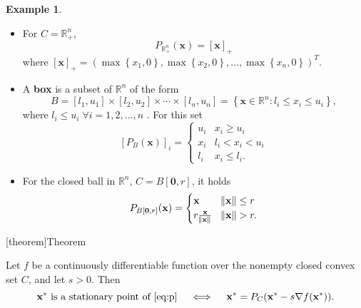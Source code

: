 \documentclass[12pt]{report}
\theoremstyle{definition}
\begin{document}
\newtheorem{examples of orthogonal projections}[theorem]{Example}
\begin{examples of orthogonal projections}
    \;

    \begin{itemize}
        \item For $C=\mathbb{R}_+^n$,
            \[
                P_{\mathbb{R}_+^n}(\mathbf{x})={[\mathbf{x}]}_{+}
            \]
            where
            ${[\mathbf{x}]}_{+}={(\max{\left\{x_1,0\right\}},\max{\left\{x_2,0\right\}},\ldots,\max{\left\{x_n,0\right\}})}^{T}$.
            
        \item A \textbf{box} is a subset of $\mathbb{R}^{n}$ of the form
            \[
                B=[l_1,u_1]\times[l_2,u_2]\times\cdots\times[l_n,u_n]
                =\left\{\mathbf{x}\in\mathbb{R}^{n}:l_i\le x_i\le u_i\right\},
            \]
            where $l_i\le u_i\;\forall i=1,2,\ldots,n$ . For this set
            \[
                {[P_B(\mathbf{x})]}_{i}=
                \begin{cases}
                    u_i & x_i\ge u_i \\
                    x_i & l_i<x_i<u_i \\
                    l_i & x_i\le l_i.
                \end{cases}
            \]
        \item For the closed ball in $\mathbb{R}^{n}$, $C=B[\mathbf{0},r]$, it
            holds
            \[
                P_{B[\mathbf{0},r]}(\mathbf{x})=
                \begin{cases}
                    \mathbf{x} & \norm{\mathbf{x}}\le r \\
                    r \frac{\mathbf{x}}{\norm{\mathbf{x}}} &
                    \norm{\mathbf{x}}>r.
                \end{cases}
            \]
    \end{itemize}
\end{examples of orthogonal projections}

[theorem]{Theorem}
\begin{representation of stationarity via P_C}
    Let $f$ be a continuously differentiable function over the nonempty closed
    convex set $C$, and let $s>0$. Then 
    \[
        \mathbf{x}^*\text{ is a stationary point of~\eqref{eq:p}}
        \quad\iff\quad
        \mathbf{x}^*=P_C(\mathbf{x}^*-s\nabla f(\mathbf{x}^*)).
    \]
\end{representation of stationarity via P_C}
\end{document}
